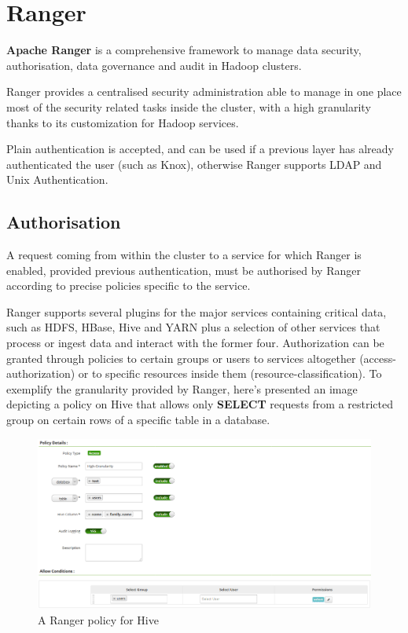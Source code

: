 \section{Ranger}

\textbf{Apache Ranger} \cite{ranger_doc} is a comprehensive framework to manage data security, authorisation, data governance and audit in Hadoop clusters.

Ranger provides a centralised security administration able to manage in one place most of the security related tasks inside the cluster, with a high granularity thanks to its customization for Hadoop services.

Plain authentication is accepted, and can be used if a previous layer has already authenticated the user (such as Knox), otherwise Ranger supports LDAP and Unix Authentication.

\subsection{Authorisation}
A request coming from within the cluster to a service for which Ranger is enabled, provided previous authentication, must be authorised by Ranger according to precise policies specific to the service.

Ranger supports several plugins for the major services containing critical data, such as HDFS, HBase, Hive and YARN plus a selection of other services that process or ingest data and interact with the former four.
\newline Authorization can be granted through policies to certain groups or users to services altogether (access-authorization) or to specific resources inside them (resource-classification).
\newline
To exemplify the granularity provided by Ranger, here's presented an image depicting a policy on Hive that allows only \textbf{SELECT} requests from a restricted group on certain rows of a specific table in a database.

\begin{figure}
	\centering
	\includegraphics[scale=0.4]{Figures/policy.png}
	\decoRule
	\caption[Infrastructural Stack]{A Ranger policy for Hive}
	\label{fig:Policy}
\end{figure}

